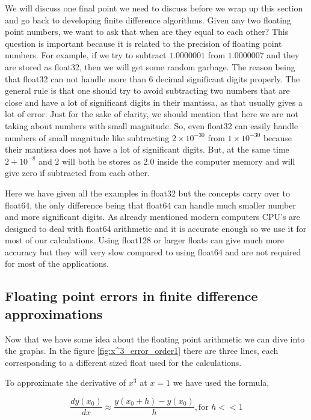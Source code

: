 We will discuss one final point we need to discuss before we wrap up this section and go back to developing finite difference algorithms. Given any two floating point numbers, we want to ask that when are they equal to each other?
This question is important because it is related to the precision of floating point numbers. For example, if we try to subtract $1.0000001$ from $1.0000007$ and they are stored as float32, then we will get some random garbage. The reason being that float32 can not handle more than 6 decimal significant digits properly.
The general rule is that one should try to avoid subtracting two numbers that are close and have a lot of significant digits in their mantissa, as that usually gives a lot of error.
Just for the sake of clarity, we should mention that here we are not taking about numbers with small magnitude. So, even float32 can easily handle numbers of small magnitude like subtracting $2 \times 10^{-30}$ from $1 \times 10^{-30}$ because their mantissa does not have a lot of significant digits. But, at the same time $2 + 10^{-8}$ and $2$ will both be stores as $2.0$ inside the computer memory and will give zero if subtracted from each other.


Here we have given all the examples in float32 but the concepts carry over to float64, the only difference being that float64 can handle much smaller number and more significant digits. As already mentioned modern computers CPU's are designed to deal with float64 arithmetic and it is accurate enough so we use it for most of our calculations. Using float128 or larger floats can give much more accuracy but they will very slow compared to using float64 and are not required for most of the applications.

\subsection{Floating point errors in finite difference approximations}
\label{chap3:floating_point_errors}
Now that we have some idea about the floating point arithmetic we can dive into the graphs.
In the figure \ref{fig:x^3_error_order1} there are three lines, each corresponding to a different sized float used for the calculations.

To approximate the derivative of $x^3$ at $x=1$ we have used the formula,

\begin{equation}
    \frac{dy(x_0)}{dx} \approx \frac{y(x_0 + h) - y(x_0)}{h} , \text{for } h << 1
    \label{eq:first_order_2}
\end{equation}

